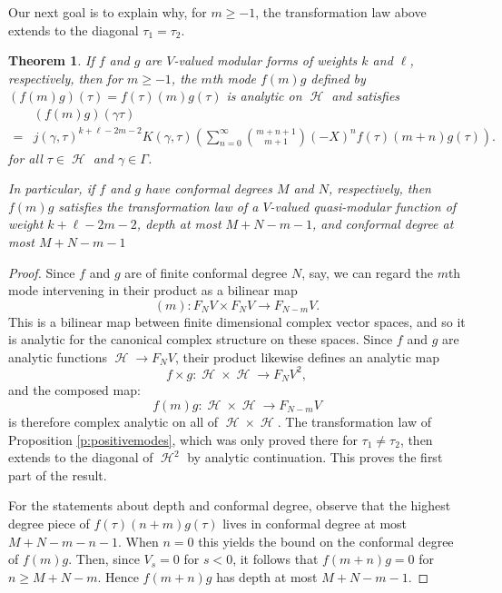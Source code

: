\documentclass[12pt]{amsart}
\theoremstyle{plain}
\newtheorem{thm}{Theorem}[section]
\theoremstyle{definition}
\theoremstyle{remark}
\DeclareMathOperator{\uhp}{\mathcal{H}}
\begin{document}
Our next goal is to explain why, for $m\geq -1$, the transformation law above extends to the diagonal $\tau_1=\tau_2$.
\begin{thm}
    \label{t:modes}
    If $f$ and $g$ are $V$-valued modular forms of weights $k$ and $\ell$, respectively, then for $m\geq -1$, the $m$th mode $f(m)g$ defined by
    $(f(m)g)(\tau) = f(\tau)(m)g(\tau)$
    is analytic on $\uhp$ and satisfies
    \begin{align}
        \label{eq:prodtran2}
        &(f(m)g)(\gamma\tau)\\
        \nonumber =&j(\gamma,\tau)^{k+\ell-2m-2}K(\gamma,\tau)\left(\sum_{n=0}^{\infty}\binom{m+n+1}{m+1}(-X)^nf(\tau)(m+n)g(\tau)\right).
    \end{align}
    for all $\tau \in \uhp$ and $\gamma \in \Gamma$. 
    
    In particular, if $f$ and $g$ have conformal degrees $M$ and $N$, respectively, then $f(m)g$ satisfies the transformation law of a $V$-valued quasi-modular function of weight $k+\ell-2m-2$, depth at most $M+N-m-1$, and conformal degree at most $M+N-m-1$
\end{thm}
\begin{proof}
    Since $f$ and $g$ are of finite conformal degree $N$, say, we can regard the $m$th mode intervening in their product as a bilinear map
    \[
    (m) \colon F_NV \times F_NV \to F_{N-m}V.
    \]
    This is a bilinear map between finite dimensional complex vector spaces, and so it is analytic for the canonical complex structure on these spaces. Since $f$ and $g$ are analytic functions $\uhp \to F_NV$, their product likewise defines an analytic map 
    \[f\times g \colon \uhp\times\uhp \to F_NV^2,\] 
    and the composed map:
    \[
    f(m)g\colon \uhp \times \uhp \to F_{N-m}V
    \]
    is therefore complex analytic on all of $\uhp\times \uhp$. The transformation law of Proposition \ref{p:positivemodes}, which was only proved there for $\tau_1\neq \tau_2$, then extends to the diagonal of $\uhp^2$ by analytic continuation. This proves the first part of the result.

    For the statements about depth and conformal degree, observe that the highest degree piece of $f(\tau)(n+m)g(\tau)$ lives in conformal degree at most $M+N-m-n-1$. When $n=0$ this yields the bound on the conformal degree of $f(m)g$. Then, since $V_{s} = 0$ for $s < 0$, it follows that $f(m+n)g=0$ for $n \geq M+N-m$. Hence $f(m+n)g$ has depth at most $M+N-m-1$.
\end{proof}
\end{document}
